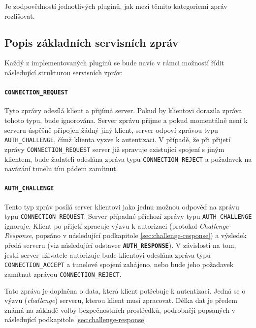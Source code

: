 \documentclass[thesis=M,czech]{FITthesis}[2012/10/20]
\begin{document}
Je zodpovědností jednotlivých pluginů, jak mezi těmito kategoriemi zpráv rozlišovat. 

\subsection{Popis základních servisních zpráv}
\label{subsec:msg-types}

Každý z implementovaných pluginů se bude navíc v rámci možností řídit následující strukturou servisních zpráv:

  \paragraph{\texttt{CONNECTION\_REQUEST}}
  
    Tyto zprávy odesílá klient a přijímá server. Pokud by klientovi dorazila zpráva tohoto typu, bude ignorována. Server zprávu přijme a pokud momentálně není k serveru úspěšně připojen žádný jiný klient, server odpoví zprávou typu \texttt{AUTH\_CHALLENGE}, čímž klienta vyzve k autentizaci. V případě, že při přijetí zprávy \texttt{CONNECTION\_REQUEST} server již spravuje existující spojení s jiným klientem, bude žadateli odeslána zpráva typu \texttt{CONNECTION\_REJECT} a požadavek na navázání tunelu tím pádem zamítnut.
    
  \paragraph{\texttt{AUTH\_CHALLENGE}}
  
    Tento typ zpráv posílá server klientovi jako jednu možnou odpověď na zprávu typu \texttt{CONNECTION\_REQUEST}. Server případné příchozí zprávy typu \texttt{AUTH\_CHALLENGE} ignoruje. Klient po přijetí zpracuje výzvu k autorizaci (protokol \textit{Challenge-Response}, popsáno v následující podkapitole \ref{sec:challenge-response}) a výsledek předá serveru (viz následující odstavec \textbf{\texttt{AUTH\_RESPONSE}}). V závislosti na tom, jestli server uživatele autorizuje bude klientovi odeslána zpráva typu \texttt{CONNECTION\_ACCEPT} a tunelové spojení zahájeno, nebo bude jeho požadavek zamítnut zprávou \texttt{CONNECTION\_REJECT}.
    
    Tato zpráva je doplněna o data, která klient potřebuje k autentizaci. Jedná se o výzvu (\textit{challenge}) serveru, kterou klient musí zpracovat. Délka dat je předem známá na základě volby bezpečnostních prostředků, podrobněji popsaných v následující podkapitole \ref{sec:challenge-response}.
    
\end{document}
